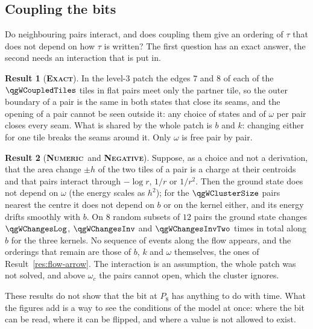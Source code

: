 \documentclass[11pt]{article}
\newcommand{\exact}{\textbf{\textsc{Exact}}}
\newcommand{\numeric}{\textbf{\textsc{Numeric}}}
\newcommand{\negres}{\textbf{\textsc{Negative}}}
\theoremstyle{definition}
\newtheorem{result}{Result}
\begin{document}
\subsection{Coupling the bits}\label{sec:flow-couple}
Do neighbouring pairs interact, and does coupling them give an ordering of $\tau$ that does not depend on how $\tau$ is written? The first question has an exact answer, the second needs an interaction that is put in.
\begin{result}[\exact]\label{res:flow-decouple}
In the level-$3$ patch the edges $7$ and $8$ of each of the $\qgWCoupledTiles$ tiles in flat pairs meet only the partner tile, so the outer boundary of a pair is the same in both states that close its seams, and the opening of a pair cannot be seen outside it: any choice of states and of $\omega$ per pair closes every seam. What is shared by the whole patch is $b$ and $k$: changing either for one tile breaks the seams around it. Only $\omega$ is free pair by pair.
\end{result}
\begin{result}[\numeric\ and \negres]\label{res:flow-couple}
Suppose, as a choice and not a derivation, that the area change $\pm h$ of the two tiles of a pair is a charge at their centroids and that pairs interact through $-\log r$, $1/r$ or $1/r^2$. Then the ground state does not depend on $\omega$ (the energy scales as $h^2$); for the $\qgWClusterSize$ pairs nearest the centre it does not depend on $b$ or on the kernel either, and its energy drifts smoothly with $b$. On $8$ random subsets of $12$ pairs the ground state changes $\qgWChangesLog$, $\qgWChangesInv$ and $\qgWChangesInvTwo$ times in total along $b$ for the three kernels. No sequence of events along the flow appears, and the orderings that remain are those of $b$, $k$ and $\omega$ themselves, the ones of Result~\ref{res:flow-arrow}. The interaction is an assumption, the whole patch was not solved, and above $\omega_c$ the pairs cannot open, which the cluster ignores.
\end{result}
These results do not show that the bit at $P_8$ has anything to do with time. What the figures add is a way to see the conditions of the model at once: where the bit can be read, where it can be flipped, and where a value is not allowed to exist.

\end{document}
